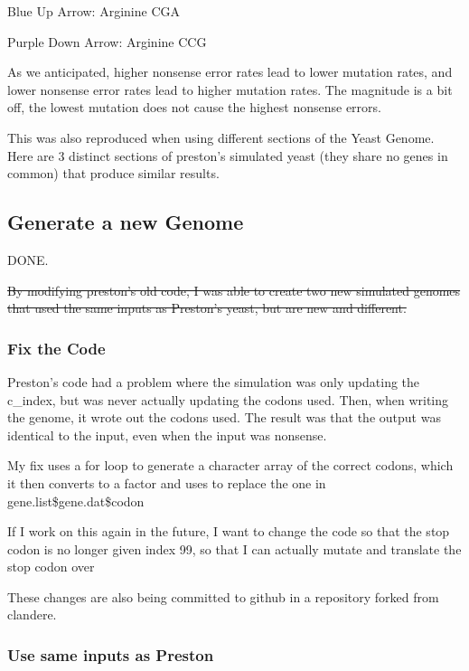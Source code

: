 Blue Up Arrow: Arginine CGA

Purple Down Arrow: Arginine CCG

As we anticipated, higher nonsense error rates lead to lower mutation rates, and lower nonsense error rates lead to higher mutation rates. The magnitude is a bit off, the lowest mutation does not cause the highest nonsense errors.

This was also reproduced when using different sections of the Yeast Genome. Here are 3 distinct sections of preston's simulated yeast (they share no genes in common) that produce similar results.






\subsection{Generate a new Genome}

DONE.

\sout{By modifying preston's old code, I was able to create two new simulated genomes that used the same inputs as Preston's yeast, but are new and different.}

\subsubsection{Fix the Code}

Preston's code had a problem where the simulation was only updating the c\_index, but was never actually updating the codons used. Then, when writing the genome, it wrote out the codons used. The result was that the output was identical to the input, even when the input was nonsense.

My fix uses a for loop to generate a character array of the correct codons, which it then converts to a factor and uses to replace the one in gene.list\$gene.dat\$codon

If I work on this again in the future, I want to change the code so that the stop codon is no longer given index 99, so that I can actually mutate and translate the stop codon over

These changes are also being committed to github in a repository forked from clandere.

\subsubsection{Use same inputs as Preston}

